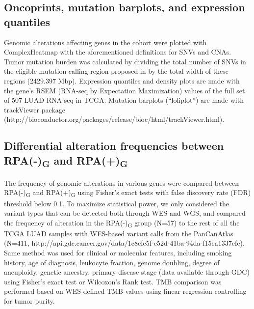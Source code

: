 \documentclass[phd,tocprelim]{cornell}
\begin{document}
\subsection*{Oncoprints, mutation barplots, and expression quantiles}
Genomic alterations affecting genes in the cohort were plotted with ComplexHeatmap \cite{Gu2016-ft} with the aforementioned definitions for SNVs and CNAs. Tumor mutation burden was calculated by dividing the total number of SNVs in the eligible mutation calling region proposed in \cite{Li2014-mj} by the total width of these regions (2429.397 Mbp). Expression quantiles and density plots are made with the gene’s RSEM (RNA-seq by Expectation Maximization) values of the full set of 507 LUAD RNA-seq in TCGA. Mutation barplots (“loliplot”) are made with trackViewer package (http://bioconductor.org/packages/release/bioc/html/trackViewer.html).

\subsection*{Differential alteration frequencies between RPA(-)\textsubscript{G} and RPA(+)\textsubscript{G}}
The frequency of genomic alterations in various genes were compared between RPA(-)\textsubscript{G} and RPA(+)\textsubscript{G} using Fisher’s exact tests with false discovery rate (FDR) threshold below 0.1. To maximize statistical power, we only considered the variant types that can be detected both through WES and WGS, and compared the frequency of alteration in the RPA(-)\textsubscript{G} group (N=57) to the rest of all the TCGA LUAD samples with WES-based variant calls from the PanCanAtlas (N=411, http://api.gdc.cancer.gov/data/1c8cfe5f-e52d-41ba-94da-f15ea1337efc). Same method was used for clinical or molecular features, including smoking history, age of diagnosis, leukocyte fraction, genome doubling, degree of aneuploidy, genetic ancestry, primary disease stage (data available through GDC) using Fisher’s exact test or Wilcoxon’s Rank test. TMB comparison was performed based on WES-defined TMB values using linear regression controlling for tumor purity.
\end{document}

